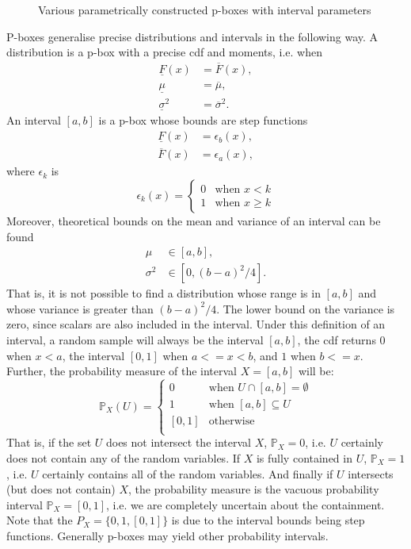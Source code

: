 \documentclass{juliacon}
\begin{document}
\begin{figure}[htp]
  \caption{Various parametrically constructed p-boxes with interval parameters}
  \label{fig:figure3}
\end{figure}
P-boxes generalise precise distributions and intervals in the following way. A distribution is a p-box with a precise cdf and moments, i.e. when
\begin{align*}
  \underline{F}(x) &= \overline{F}(x), \\ 
  \underline{\mu}  &= \overline{\mu}, \\ 
  \underline{\sigma}^2 &= \overline{\sigma}^2 .
\end{align*}
\noindent An interval $[a,b]$ is a p-box whose bounds are step functions
\begin{align*}
    \underline{F}(x) &= \epsilon_{b}(x) ,\\
    \overline{F}(x) &= \epsilon_{a}(x) ,
\end{align*}
\noindent where $\epsilon_k$ is
\begin{equation*}
   \epsilon_k(x) = \begin{cases} 0 &\text{when } x < k \\ 1 &\text{when } x \geq k \end{cases}
\end{equation*}
\noindent Moreover, theoretical bounds on the mean and variance of an interval can be found \cite{ferson2002ramas}
\begin{align*}
  \mu &\in [a, b], \\
  \sigma^2 &\in [0, (b - a)^{2}/4].
\end{align*}
\noindent That is, it is not possible to find a distribution whose range is in $[a, b]$ and whose variance is greater than $(b-a)^{2}/4$. The lower bound on the variance is zero, since scalars are also included in the interval. Under this definition of an interval, a random sample will always be the interval $[a, b]$, the cdf returns 0 when $x < a$, the interval $[0,1]$ when $a <= x < b$, and $1$ when $b <= x$. Further, the probability measure of the interval $X = [a, b]$ will be: 
\begin{equation*}
  \mathbb{P}_{X}(U) = \begin{cases}
    0 & \text{when } U \cap [a,b] = \emptyset \\
    1 & \text{when } [a,b] \subseteq U  \\
    [0, 1] & \text{otherwise }\\
  \end{cases}
\end{equation*}
\noindent That is, if the set $U$ does not intersect the interval $X$, $\mathbb{P}_{X}=0$, i.e. $U$ certainly does not contain any of the random variables. If $X$ is fully contained in $U$, $\mathbb{P}_{X}=1$, i.e. $U$ certainly contains all of the random variables. And finally if $U$ intersects (but does not contain) $X$, the probability measure is the vacuous probability interval $\mathbb{P}_{X} = [0, 1]$, i.e. we are completely uncertain about the containment. Note that the $P_{X} = \{0, 1, [0,1]\}$ is due to the interval bounds being step functions. Generally p-boxes may yield other probability intervals.
\end{document}
